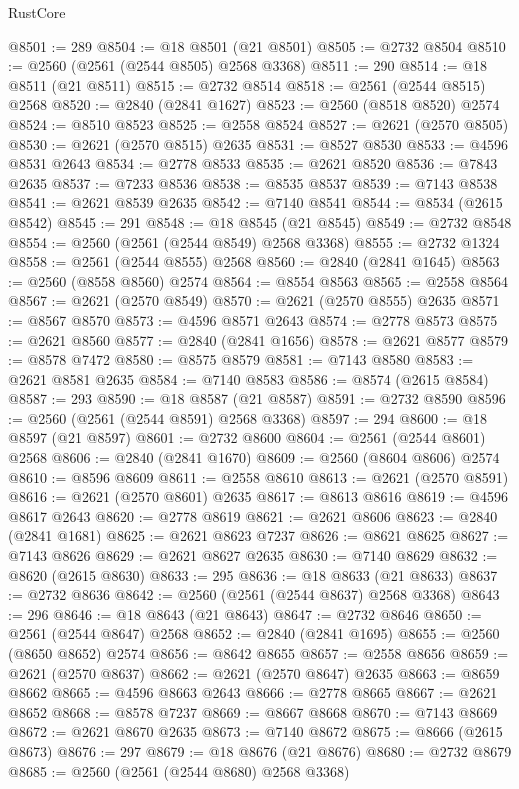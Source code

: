 \begin{lexlean}{RustCore}
\begin{coremodule}
@8501 := 289
@8504 := @18 @8501 (@21 @8501)
@8505 := @2732 @8504
@8510 := @2560 (@2561 (@2544 @8505) @2568 @3368)
@8511 := 290
@8514 := @18 @8511 (@21 @8511)
@8515 := @2732 @8514
@8518 := @2561 (@2544 @8515) @2568
@8520 := @2840 (@2841 @1627)
@8523 := @2560 (@8518 @8520) @2574
@8524 := @8510 @8523
@8525 := @2558 @8524
@8527 := @2621 (@2570 @8505)
@8530 := @2621 (@2570 @8515) @2635
@8531 := @8527 @8530
@8533 := @4596 @8531 @2643
@8534 := @2778 @8533
@8535 := @2621 @8520
@8536 := @7843 @2635
@8537 := @7233 @8536
@8538 := @8535 @8537
@8539 := @7143 @8538
@8541 := @2621 @8539 @2635
@8542 := @7140 @8541
@8544 := @8534 (@2615 @8542)
@8545 := 291
@8548 := @18 @8545 (@21 @8545)
@8549 := @2732 @8548
@8554 := @2560 (@2561 (@2544 @8549) @2568 @3368)
@8555 := @2732 @1324
@8558 := @2561 (@2544 @8555) @2568
@8560 := @2840 (@2841 @1645)
@8563 := @2560 (@8558 @8560) @2574
@8564 := @8554 @8563
@8565 := @2558 @8564
@8567 := @2621 (@2570 @8549)
@8570 := @2621 (@2570 @8555) @2635
@8571 := @8567 @8570
@8573 := @4596 @8571 @2643
@8574 := @2778 @8573
@8575 := @2621 @8560
@8577 := @2840 (@2841 @1656)
@8578 := @2621 @8577
@8579 := @8578 @7472
@8580 := @8575 @8579
@8581 := @7143 @8580
@8583 := @2621 @8581 @2635
@8584 := @7140 @8583
@8586 := @8574 (@2615 @8584)
@8587 := 293
@8590 := @18 @8587 (@21 @8587)
@8591 := @2732 @8590
@8596 := @2560 (@2561 (@2544 @8591) @2568 @3368)
@8597 := 294
@8600 := @18 @8597 (@21 @8597)
@8601 := @2732 @8600
@8604 := @2561 (@2544 @8601) @2568
@8606 := @2840 (@2841 @1670)
@8609 := @2560 (@8604 @8606) @2574
@8610 := @8596 @8609
@8611 := @2558 @8610
@8613 := @2621 (@2570 @8591)
@8616 := @2621 (@2570 @8601) @2635
@8617 := @8613 @8616
@8619 := @4596 @8617 @2643
@8620 := @2778 @8619
@8621 := @2621 @8606
@8623 := @2840 (@2841 @1681)
@8625 := @2621 @8623 @7237
@8626 := @8621 @8625
@8627 := @7143 @8626
@8629 := @2621 @8627 @2635
@8630 := @7140 @8629
@8632 := @8620 (@2615 @8630)
@8633 := 295
@8636 := @18 @8633 (@21 @8633)
@8637 := @2732 @8636
@8642 := @2560 (@2561 (@2544 @8637) @2568 @3368)
@8643 := 296
@8646 := @18 @8643 (@21 @8643)
@8647 := @2732 @8646
@8650 := @2561 (@2544 @8647) @2568
@8652 := @2840 (@2841 @1695)
@8655 := @2560 (@8650 @8652) @2574
@8656 := @8642 @8655
@8657 := @2558 @8656
@8659 := @2621 (@2570 @8637)
@8662 := @2621 (@2570 @8647) @2635
@8663 := @8659 @8662
@8665 := @4596 @8663 @2643
@8666 := @2778 @8665
@8667 := @2621 @8652
@8668 := @8578 @7237
@8669 := @8667 @8668
@8670 := @7143 @8669
@8672 := @2621 @8670 @2635
@8673 := @7140 @8672
@8675 := @8666 (@2615 @8673)
@8676 := 297
@8679 := @18 @8676 (@21 @8676)
@8680 := @2732 @8679
@8685 := @2560 (@2561 (@2544 @8680) @2568 @3368)

\end{coremodule}
\end{lexlean}
